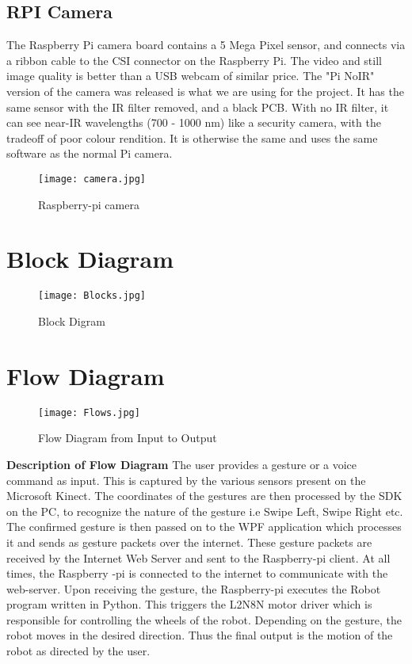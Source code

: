 \subsection{RPI Camera}
The Raspberry Pi camera board contains a 5 Mega Pixel sensor, and connects via a ribbon cable to the CSI connector on the Raspberry Pi. The video and still image quality is better than a USB webcam of similar price. The "Pi NoIR" version of the camera was released is what we are using for the project. It has the same sensor with the IR filter removed, and a black PCB. With no IR filter, it can see near-IR wavelengths (700 - 1000 nm) like a security camera, with the tradeoff of poor colour rendition. It is otherwise the same and uses the same software as the normal Pi camera.

\begin{figure}[H]
  \centering
  \texttt{[image: camera.jpg]}
  \caption{Raspberry-pi camera}
  \label{RPI camera}	
\end{figure}

\section{Block Diagram}

\begin{figure}[H]
  \centering
  \texttt{[image: Blocks.jpg]}
  \caption{Block Digram}
  \label{block}	
\end{figure}


\section{Flow Diagram}



\begin{figure}[H]
  \centering
  \texttt{[image: Flows.jpg]}
  \caption{Flow Diagram from Input to Output}
  \label{Flow}	
\end{figure}
\textbf{Description of Flow Diagram}
\newline
The user provides a gesture or a voice command as input. This is captured by the various sensors present on the Microsoft Kinect. The coordinates of the gestures are then processed by the SDK on the PC, to recognize the nature of the gesture i.e Swipe Left, Swipe Right etc. The confirmed gesture is then passed on to the WPF application which processes it and sends as gesture packets over the internet. These gesture packets are received by the Internet Web Server and sent to the Raspberry-pi client. At all times, the Raspberry -pi is connected to the internet to communicate with the web-server. Upon receiving the gesture, the Raspberry-pi executes the Robot program written in Python. This triggers the L2N8N motor driver which is responsible for controlling the wheels of the robot. Depending on the gesture, the robot moves in the desired direction. Thus the final output is the motion of the robot as directed by the user.





